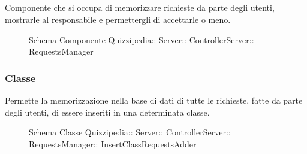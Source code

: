 \subsection{}
Componente che si occupa di memorizzare richieste da parte degli utenti, mostrarle al responsabile e permettergli di accettarle o meno.
\begin{figure}[H]
\centering
\noindent{}
\caption[Schema Componente Quizzipedia::Server::ControllerServer::RequestsManager]{Schema Componente Quizzipedia:: Server:: ControllerServer:: RequestsManager}
\end{figure}
\subsubsection{Classe }
Permette la memorizzazione nella base di dati di tutte le richieste, fatte da parte degli utenti, di essere inseriti in una determinata classe.
\begin{figure}[H]
\centering
\noindent{}
\caption[Schema Classe InsertClassRequestsAdder]{Schema Classe Quizzipedia:: Server:: ControllerServer:: RequestsManager:: InsertClassRequestsAdder}
\end{figure}
